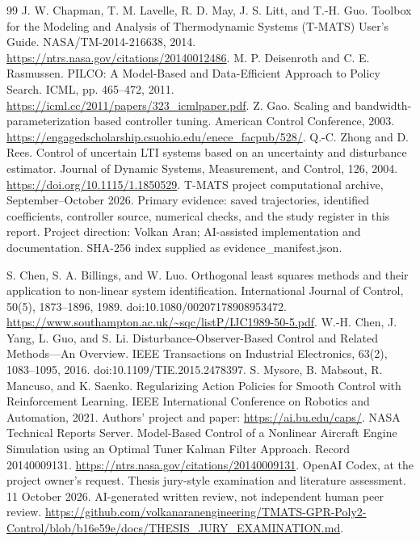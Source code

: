 \begin{thebibliography}{99}
 J. W. Chapman, T. M. Lavelle, R. D. May, J. S. Litt, and T.-H. Guo. Toolbox for the Modeling and Analysis of Thermodynamic Systems (T-MATS) User's Guide. NASA/TM-2014-216638, 2014. \url{https://ntrs.nasa.gov/citations/20140012486}.
 M. P. Deisenroth and C. E. Rasmussen. PILCO: A Model-Based and Data-Efficient Approach to Policy Search. ICML, pp. 465--472, 2011. \url{https://icml.cc/2011/papers/323_icmlpaper.pdf}.
 Z. Gao. Scaling and bandwidth-parameterization based controller tuning. American Control Conference, 2003. \url{https://engagedscholarship.csuohio.edu/enece_facpub/528/}.
 Q.-C. Zhong and D. Rees. Control of uncertain LTI systems based on an uncertainty and disturbance estimator. Journal of Dynamic Systems, Measurement, and Control, 126, 2004. \url{https://doi.org/10.1115/1.1850529}.
 T-MATS project computational archive, September--October 2026. Primary evidence: saved trajectories, identified coefficients, controller source, numerical checks, and the study register in this report. Project direction: Volkan Aran; AI-assisted implementation and documentation. SHA-256 index supplied as evidence\_manifest.json.

 S. Chen, S. A. Billings, and W. Luo. Orthogonal least squares methods and their application to non-linear system identification. International Journal of Control, 50(5), 1873--1896, 1989. doi:10.1080/00207178908953472. \url{https://www.southampton.ac.uk/~sqc/listP/IJC1989-50-5.pdf}.
 W.-H. Chen, J. Yang, L. Guo, and S. Li. Disturbance-Observer-Based Control and Related Methods---An Overview. IEEE Transactions on Industrial Electronics, 63(2), 1083--1095, 2016. doi:10.1109/TIE.2015.2478397.
 S. Mysore, B. Mabsout, R. Mancuso, and K. Saenko. Regularizing Action Policies for Smooth Control with Reinforcement Learning. IEEE International Conference on Robotics and Automation, 2021. Authors' project and paper: \url{https://ai.bu.edu/caps/}.
 NASA Technical Reports Server. Model-Based Control of a Nonlinear Aircraft Engine Simulation using an Optimal Tuner Kalman Filter Approach. Record 20140009131. \url{https://ntrs.nasa.gov/citations/20140009131}.
 OpenAI Codex, at the project owner's request. Thesis jury-style examination and literature assessment. 11 October 2026. AI-generated written review, not independent human peer review. \url{https://github.com/volkanaranengineering/TMATS-GPR-Poly2-Control/blob/b16e59e/docs/THESIS_JURY_EXAMINATION.md}.
\end{thebibliography}

